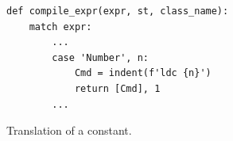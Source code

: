\begin{figure}[!ht]
\centering
\begin{verbatim}
def compile_expr(expr, st, class_name):
    match expr:
        ...
        case 'Number', n:
            Cmd = indent(f'ldc {n}')
            return [Cmd], 1
        ...
\end{verbatim}
\vspace*{-0.3cm}
\caption{Translation of a constant.}
\label{fig:Compiler.ipynb:compile:const}
\end{figure}

